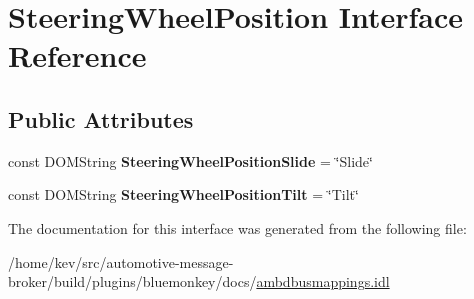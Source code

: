 \hypertarget{interfaceSteeringWheelPosition}{\section{Steering\+Wheel\+Position Interface Reference}
\label{interfaceSteeringWheelPosition}
}
\subsection*{Public Attributes}
\begin{DoxyCompactItemize}
\item 
\hypertarget{interfaceSteeringWheelPosition_aece28628ff6bd3a04ea7d7424c0c4cfe}{const D\+O\+M\+String {\bfseries Steering\+Wheel\+Position\+Slide} = \char`\"{}Slide\char`\"{}}\label{interfaceSteeringWheelPosition_aece28628ff6bd3a04ea7d7424c0c4cfe}

\item 
\hypertarget{interfaceSteeringWheelPosition_a9d9c029923c4608d054de610212b2a0e}{const D\+O\+M\+String {\bfseries Steering\+Wheel\+Position\+Tilt} = \char`\"{}Tilt\char`\"{}}\label{interfaceSteeringWheelPosition_a9d9c029923c4608d054de610212b2a0e}

\end{DoxyCompactItemize}


The documentation for this interface was generated from the following file\+:\begin{DoxyCompactItemize}
\item 
/home/kev/src/automotive-\/message-\/broker/build/plugins/bluemonkey/docs/\hyperlink{ambdbusmappings_8idl}{ambdbusmappings.\+idl}\end{DoxyCompactItemize}
